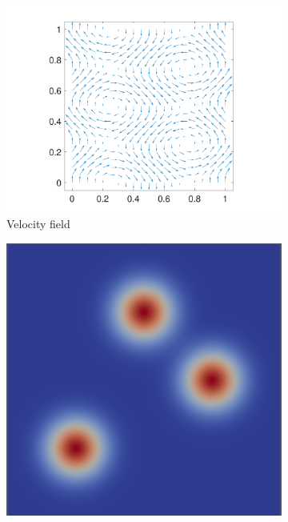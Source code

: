 \documentclass[a4paper,10pt]{article}
\begin{document}
%
\begin{figure}[!htb]
  \centering
  \begin{subfigure}[b]{0.3\textwidth}
    \includegraphics[width=\textwidth]{./figures/velocity_field.pdf}
    \caption{Velocity field}\label{fig:v}
  \end{subfigure}
   \begin{subfigure}[b]{0.3\textwidth}
    \includegraphics[width=\textwidth]{./figures/solution.0000.png}

\end{subfigure}
\end{figure}
\end{document}
